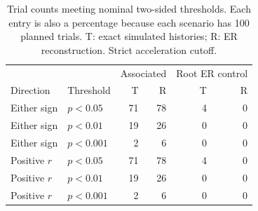 \begin{table}[ht]
\centering
\caption{Trial counts meeting nominal two-sided thresholds. Each entry is also a percentage because each scenario has 100 planned trials. T: exact simulated histories; R: ER reconstruction. Strict acceleration cutoff.}
\label{tab:paired-neff}
\begin{tabular}{llrrrr}
\toprule
 & & \multicolumn{2}{c}{Associated} & \multicolumn{2}{c}{Root ER control} \\
Direction & Threshold & T & R & T & R \\
\midrule
Either sign & $p<0.05$ & 71 & 78 & 4 & 0 \\
Either sign & $p<0.01$ & 19 & 26 & 0 & 0 \\
Either sign & $p<0.001$ & 2 & 6 & 0 & 0 \\
Positive $r$ & $p<0.05$ & 71 & 78 & 4 & 0 \\
Positive $r$ & $p<0.01$ & 19 & 26 & 0 & 0 \\
Positive $r$ & $p<0.001$ & 2 & 6 & 0 & 0 \\
\bottomrule
\end{tabular}
\end{table}
